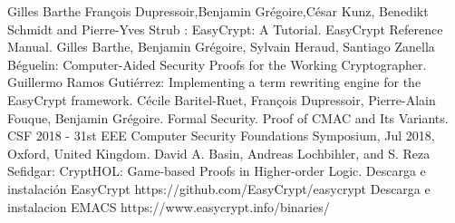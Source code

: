 \documentclass[runningheads,a4paper]{llncs}
\begin{document}
\begin{thebibliography}{1}
Gilles Barthe François Dupressoir,Benjamin Grégoire,César Kunz, Benedikt Schmidt and Pierre-Yves Strub : EasyCrypt: A Tutorial. 
EasyCrypt Reference Manual.
Gilles Barthe, Benjamin Grégoire, Sylvain Heraud, Santiago Zanella Béguelin: Computer-Aided Security Proofs
for the Working Cryptographer.
Guillermo Ramos Gutiérrez: Implementing a term rewriting
engine for the EasyCrypt framework.
Cécile Baritel-Ruet, François Dupressoir, Pierre-Alain Fouque, Benjamin Grégoire. Formal Security.
Proof of CMAC and Its Variants. CSF 2018 - 31st EEE Computer Security Foundations Symposium,
Jul 2018, Oxford, United Kingdom.
David A. Basin, Andreas Lochbihler, and S. Reza Sefidgar: CryptHOL: Game-based Proofs in
Higher-order Logic.
Descarga e instalación EasyCrypt https://github.com/EasyCrypt/easycrypt
Descarga e instalacion EMACS https://www.easycrypt.info/binaries/ 
\end{thebibliography}
\end{document}
